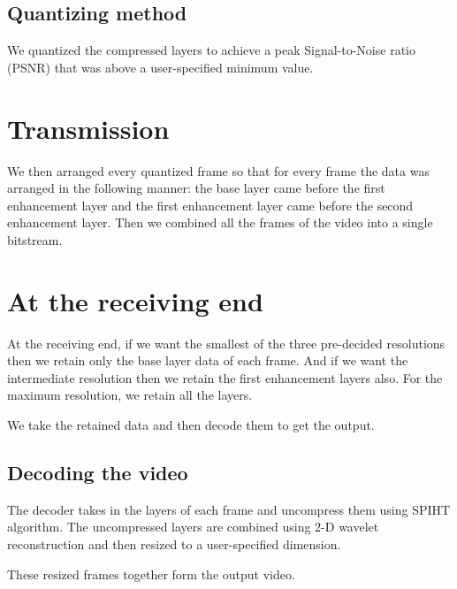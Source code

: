 \documentclass[12pt]{article}
\begin{document}
\subsection*{Quantizing method}

We quantized the compressed layers to achieve a peak Signal-to-Noise ratio (PSNR) that was above a user-specified minimum value.

\section{Transmission}

We then arranged every quantized frame so that for every frame the data was arranged in the following manner: the base layer came before the first enhancement layer and the first enhancement layer came before the second enhancement layer. Then we combined all the frames of the video into a single bitstream.

\section{At the receiving end}

At the receiving end, if we want the smallest of the three pre-decided resolutions then we retain only the base layer data of each frame. And if we want the intermediate resolution then we retain the first enhancement layers also. For the maximum resolution, we retain all the layers.

We take the retained data and then decode them to get the output.

\subsection*{Decoding the video}

The decoder takes in the layers of each frame and uncompress them using SPIHT\cite{amirSaid1996} algorithm. The uncompressed layers are combined using 2-D wavelet reconstruction and then resized to a user-specified dimension.

These resized frames together form the output video.




\end{document}
